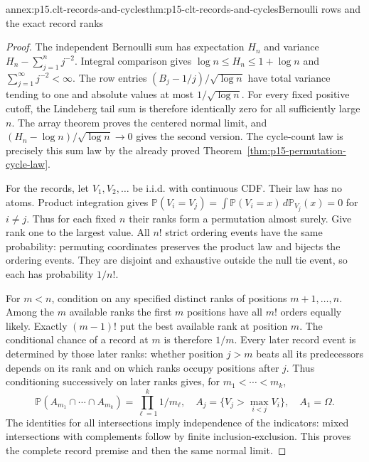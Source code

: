 \begin{annexitem}{annex:p15.clt-records-and-cycles}{thm:p15-clt-records-and-cycles}{Bernoulli rows and the exact record ranks}
\begin{proof}
The independent Bernoulli sum has expectation \(H_n\) and variance
\(H_n-\sum_{j=1}^nj^{-2}\).
Integral comparison gives \(\log n\leq H_n\leq1+\log n\)
and \(\sum_{j=1}^\infty j^{-2}<\infty\).
The row entries
\((B_j-1/j)/\sqrt{\log n}\) have total variance tending to one
and absolute values at most \(1/\sqrt{\log n}\).
For every fixed positive cutoff, the Lindeberg tail sum is
therefore identically zero for all sufficiently large \(n\).
The array theorem proves the centered normal limit, and
\((H_n-\log n)/\sqrt{\log n}\to0\) gives the second version.
The cycle-count law is precisely this sum law by the already proved
Theorem~\ref{thm:p15-permutation-cycle-law}.

For the records, let \(V_1,V_2,\ldots\) be i.i.d. with continuous
CDF. Their law has no atoms. Product integration gives
\(\mathbb P(V_i=V_j)=\int\mathbb P(V_i=x)\,d\mathbb P_{V_j}(x)=0\)
for \(i\ne j\). Thus for each fixed \(n\) their ranks form
a permutation almost surely. Give rank one to the largest value.
All \(n!\) strict ordering events have the same probability:
permuting coordinates preserves the product law and bijects the
ordering events. They are disjoint and exhaustive outside the
null tie event, so each has probability \(1/n!\).

For \(m<n\), condition on any specified distinct ranks of
positions \(m+1,\ldots,n\). Among the \(m\) available ranks
the first \(m\) positions have all \(m!\) orders equally likely.
Exactly \((m-1)!\) put the best available rank at position \(m\).
The conditional chance of a record at \(m\) is therefore \(1/m\).
Every later record event is determined by those later ranks:
whether position \(j>m\) beats all its predecessors depends on
its rank and on which ranks occupy positions after \(j\).
Thus conditioning successively on later ranks gives, for
\(m_1<\cdots<m_k\),
\[
 \mathbb P(A_{m_1}\cap\cdots\cap A_{m_k})
       =\prod_{\ell=1}^k1/m_\ell,
 \quad A_j=\{V_j>\max_{i<j}V_i\},\quad A_1=\Omega.
 \]
The identities for all intersections imply independence of the
indicators: mixed intersections with complements follow by finite
inclusion-exclusion. This proves the complete record premise and
then the same normal limit.
\end{proof}
\end{annexitem}

